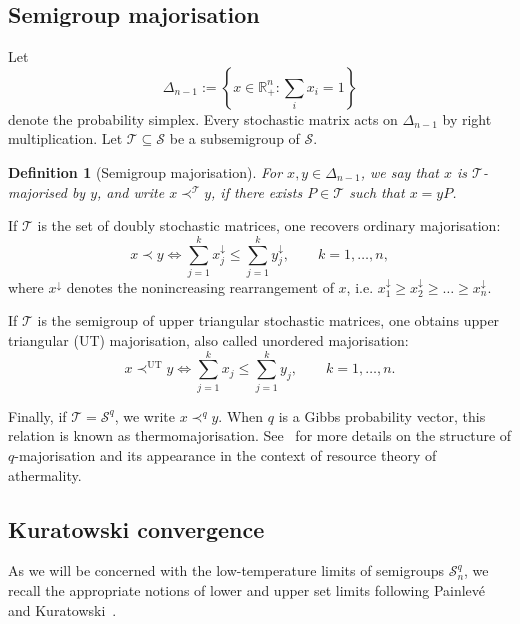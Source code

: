 \documentclass[11pt,a4paper,longbibliography]{amsart}
\numberwithin{equation}{section}
\def\R{{\mathbb R}}
\def\R{{\mathbb R}}
\theoremstyle{plain}
\newtheorem{defn}{Definition}[section]
\theoremstyle{definition}
\theoremstyle{remark}
\begin{document}
	
	\subsection{Semigroup majorisation}
	
	Let
	\begin{equation}
		\Delta_{n-1}
		:=
		\left\{
		x\in\R_+^n :
		\sum_i x_i =1
		\right\}
	\end{equation}
	denote the probability simplex.
	Every stochastic matrix acts on $\Delta_{n-1}$ by right multiplication. Let $\mathcal{T}\subseteq\mathcal{S}$ be a subsemigroup of $\mathcal{S}$.
	
	\begin{defn}[Semigroup majorisation]
		For $x,y\in\Delta_{n-1}$, we say that $x$ is $\mathcal{T}$-majorised by $y$, and write
		$  x\prec^{\mathcal T} y$,
		if there exists $P\in\mathcal T$ such that $  x=yP$.
	\end{defn}
	
	If $\mathcal T$ is the set of doubly stochastic matrices, one recovers ordinary majorisation:
	\begin{equation}
		x\prec y
		\iff
		\sum_{j=1}^k x_j^\downarrow
		\leq
		\sum_{j=1}^k y_j^\downarrow,
		\qquad
		k=1,\dots,n,
	\end{equation}
	where $x^\downarrow$ denotes the nonincreasing rearrangement of $x$, i.e. $x_1^\downarrow\geq x_2^\downarrow \geq \dots \geq x_n^\downarrow$.
	
	If $\mathcal T$ is the semigroup of upper triangular stochastic matrices, one obtains upper triangular (UT) majorisation, also called unordered majorisation:
	\begin{equation}
		x\prec^{\mathrm{UT}} y
		\iff
		\sum_{j=1}^k x_j
		\leq
		\sum_{j=1}^k y_j,
		\qquad
		k=1,\dots,n.
	\end{equation}
	
	Finally, if $\mathcal T=\mathcal S^q$, we write $    x\prec^q y$.
	When $q$ is a Gibbs probability vector, this relation is known as thermomajorisation.  See~\cite{horodecki2013fundamental, vom2019d} for more details on the structure of $q$-majorisation and its appearance in the context of resource theory of athermality.
	
	\subsection{Kuratowski convergence}
	As we will be concerned with the low-temperature limits of semigroups $\mathcal{S}_n^q$, we recall the appropriate notions of lower and upper set limits following Painlev\'e and Kuratowski~\cite[Chap.~29]{KuratowskiI}.
	
\end{document}
